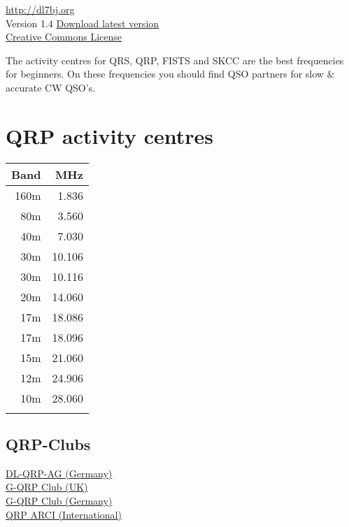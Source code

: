 \documentclass[10pt]{article}
\begin{document}
\begin{multicols}{3}
\vspace{1cm}
\noindent \thedate{} \theauthor{} \href{http://dl7bj.org}{http://dl7bj.org} \\
Version 1.4 \href{http://git.dl7bj.org/Documents}{Download latest version}\\
\ccbyncsa \hspace{0.5cm} \href{http://creativecommons.org/licenses/by-nc-sa/4.0}{Creative Commons License} \\

\newpage

The activity centres for QRS, QRP, FISTS and SKCC are the best frequencies for beginners.
On these frequencies you should find QSO partners for slow \& accurate CW QSO's.

\section{QRP activity centres}
\vspace{\baselineskip}
\begin{tabular}{rr}
Band & MHz\\ \hline 
160m & 1.836\\
 80m & 3.560\\
 40m & 7.030\\
 30m & 10.106\\
 30m & 10.116\\
 20m & 14.060\\
 17m & 18.086\\
 17m & 18.096\\
 15m & 21.060\\
 12m & 24.906\\
 10m & 28.060\\
     &       \\
\end{tabular}

\subsection{QRP-Clubs}
\href{http://www.dl-qrp-ag.de}{DL-QRP-AG (Germany)}\\
\href{http://www.gqrp.com}{G-QRP Club (UK)}\\
\href{http://www.g-qrp-dl.de}{G-QRP Club (Germany)}\\
\href{http://www.qrparci.org}{QRP ARCI (International)}\\


\end{multicols}
\end{document}
